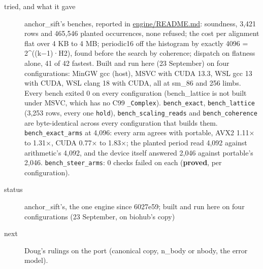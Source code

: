 \begin{description}
\item[{tried, and what it gave}] anchor\_\allowbreak{}sift's benches, reported in \href{https://github.com/dstroy0/cell_tracking/blob/main/engine/README.md}{engine/README.md}: soundness, 3,421 rows and 465,546 planted occurrences, none refused; the cost per alignment flat over 4 KB to 4 MB; periodic16 off the histogram by exactly 4096 = 2\textasciicircum{}((k−1)·H2), found before the search by coherence; dispatch on flatness alone, 41 of 42 fastest. Built and run here (23 September) on four configurations: MinGW gcc (host), MSVC with CUDA 13.3, WSL gcc 13 with CUDA, WSL clang 18 with CUDA, all at sm\_\allowbreak{}86 and 256 limbs. Every bench exited 0 on every configuration (bench\_\allowbreak{}lattice is not built under MSVC, which has no C99 \texttt{\_\allowbreak{}Complex}). \texttt{bench\_\allowbreak{}exact}, \texttt{bench\_\allowbreak{}lattice} (3,253 rows, every one \texttt{hold}), \texttt{bench\_\allowbreak{}scaling\_\allowbreak{}reads} and \texttt{bench\_\allowbreak{}coherence} are byte-identical across every configuration that builds them. \texttt{bench\_\allowbreak{}exact\_\allowbreak{}arms} at 4,096: every arm agrees with portable, AVX2 1.11× to 1.31×, CUDA 0.77× to 1.83×; the planted period read 4,092 against arithmetic's 4,092, and the device itself answered 2,046 against portable's 2,046. \texttt{bench\_\allowbreak{}steer\_\allowbreak{}arms}: 0 checks failed on each (\textbf{proved}, per configuration).
\item[{status}] anchor\_\allowbreak{}sift's, the one engine since 6027e59; built and run here on four configurations (23 September, on biohub's copy)
\item[{next}] Doug's rulings on the port (canonical copy, n\_\allowbreak{}body or nbody, the error model).
\end{description}

